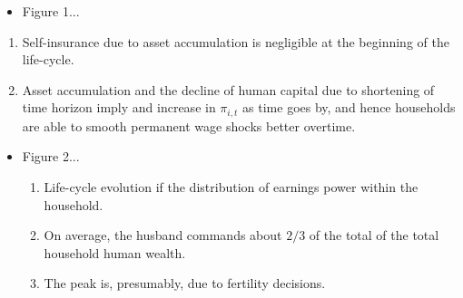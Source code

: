 \documentclass[notes=show]{beamer}
\begin{document}
\begin{frame}%


\begin{itemize}
\item Figure 1...
\end{itemize}

\begin{enumerate}
\item Self-insurance due to asset accumulation is negligible at the
beginning of the life-cycle.

\item Asset accumulation and the decline of human capital due to shortening
of time horizon imply and increase in $\pi _{i,t}$ as time goes by, and
hence households are able to smooth permanent wage shocks better overtime.
\end{enumerate}

\begin{itemize}
\item Figure 2...

\begin{enumerate}
\item Life-cycle evolution if the distribution of earnings power within the
household.

\item On average, the husband commands about $2/3$ of the total of the total
household human wealth.

\item The peak is, presumably, due to fertility decisions.
\end{enumerate}
\end{itemize}

\transboxout%
\end{frame}%

\bigskip
\end{document}
